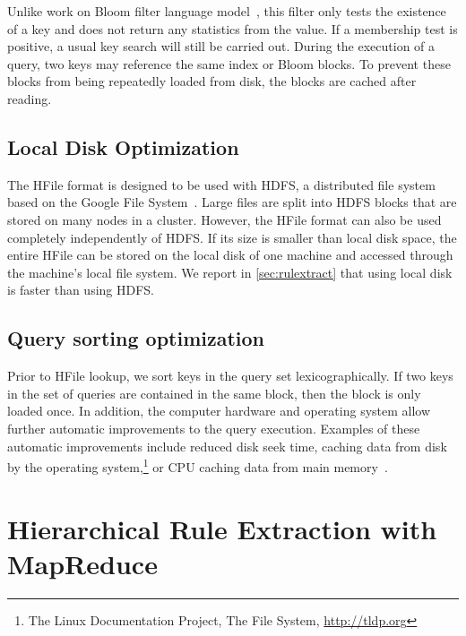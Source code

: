 Unlike work on Bloom filter language
model~\citep{talbot-osborne:2007:ACL,talbot-osborne:2007:EMNLP-CoNLL}, this
filter only tests the existence of a key and does not return any statistics from
the value. If a membership test is positive, a usual key search will
still be carried out. During the execution of a query, two keys may
reference the same index or Bloom blocks. To prevent these blocks from being
repeatedly loaded from disk, the blocks are cached after reading.

\subsection{Local Disk Optimization}

The HFile format is designed to be used with HDFS, a distributed file system
based on the Google File System~\citep{ghemawat-gobioff-leung:2003:OSP}. Large
files are split into HDFS blocks that are stored on many nodes in a cluster.
However, the HFile format can also be used completely independently of HDFS. If
its size is smaller than local disk space, the entire HFile can be stored on the local
disk of one machine and accessed through the machine's local file system. We
report in \autoref{sec:rulextract} that using local disk
is faster than using HDFS.

\subsection{Query sorting optimization}
\label{sec:querySortingOptimization}

Prior to HFile lookup, we sort keys in the query set lexicographically. If two
keys in the set of queries are contained in the same block, then the block is
only loaded once. In addition, the computer hardware and operating system allow
further automatic improvements to the query execution. Examples of these
automatic improvements include reduced disk seek time,
caching data from
disk by the operating system,\footnote{The Linux Documentation Project, The File System, \url{http://tldp.org}}
or CPU caching data from main memory~\citep{patterson-hennessy:2005:COA}.

\section{Hierarchical Rule Extraction with MapReduce}
\label{sec:rulextractMapReduce}

